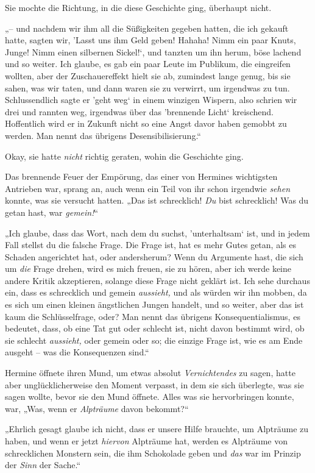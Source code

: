 Sie mochte die Richtung, in die diese Geschichte ging, überhaupt nicht. 

„– und nachdem wir ihm all die Süßigkeiten gegeben hatten, die ich gekauft hatte, sagten wir, ’Lasst uns ihm Geld geben! Hahaha! Nimm ein paar Knuts, Junge! Nimm einen silbernen Sickel!‘, und tanzten um ihn herum, böse lachend und so weiter. Ich glaube, es gab ein paar Leute im Publikum, die eingreifen wollten, aber der Zuschauereffekt hielt sie ab, zumindest lange genug, bis sie sahen, was wir taten, und dann waren sie zu verwirrt, um irgendwas zu tun. Schlussendlich sagte er ’geht weg‘ in einem winzigen Wispern, also schrien wir drei und rannten weg, irgendwas über das ’brennende Licht‘ kreischend. Hoffentlich wird er in Zukunft nicht so eine Angst davor haben gemobbt zu werden. Man nennt das übrigens Desensibilisierung.“ 

Okay, sie hatte \emph{nicht} richtig geraten, wohin die Geschichte ging.

Das brennende Feuer der Empörung, das einer von Hermines wichtigsten Antrieben war, sprang an, auch wenn ein Teil von ihr schon irgendwie \emph{sehen} konnte, was sie versucht hatten. „Das ist schrecklich! \emph{Du} bist schrecklich! Was du getan hast, war \emph{gemein!}“ 

„Ich glaube, dass das Wort, nach dem du suchst, ’unterhaltsam‘ ist, und in jedem Fall stellst du die falsche Frage. Die Frage ist, hat es mehr Gutes getan, als es Schaden angerichtet hat, oder andersherum? Wenn du Argumente hast, die sich um \emph{die} Frage drehen, wird es mich freuen, sie zu hören, aber ich werde keine andere Kritik akzeptieren, solange diese Frage nicht geklärt ist. Ich sehe durchaus ein, dass es schrecklich und gemein \emph{aussieht,} und als würden wir ihn mobben, da es sich um einen kleinen ängstlichen Jungen handelt, und so weiter, aber das ist kaum die Schlüsselfrage, oder? Man nennt das übrigens Konsequentialismus, es bedeutet, dass, ob eine Tat gut oder schlecht ist, nicht davon bestimmt wird, ob sie schlecht \emph{aussieht,} oder gemein oder so; die einzige Frage ist, wie es am Ende ausgeht – was die Konsequenzen sind.“ 

Hermine öffnete ihren Mund, um etwas absolut \emph{Vernichtendes} zu sagen, hatte aber unglücklicherweise den Moment verpasst, in dem sie sich überlegte, was sie sagen wollte, bevor sie den Mund öffnete. Alles was sie hervorbringen konnte, war, „Was, wenn er \emph{Alpträume} davon bekommt?“ 

„Ehrlich gesagt glaube ich nicht, dass er unsere Hilfe brauchte, um Alpträume zu haben, und wenn er jetzt \emph{hiervon} Alpträume hat, werden es Alpträume von schrecklichen Monstern sein, die ihm Schokolade geben und \emph{das} war im Prinzip der \emph{Sinn} der Sache.“ 

